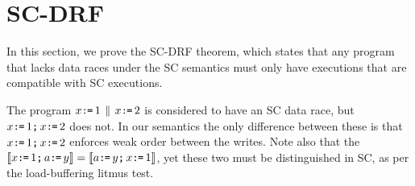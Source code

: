 \section{SC-DRF}


In this section, we prove the SC-DRF theorem, which states that any program
that lacks data races under the SC semantics must only have executions that
are compatible with SC executions.

The program $x\GETS1\PAR x\GETS2$ is considered to have an SC data race, but
$x\GETS1\SEMI x\GETS2$ does not.  In our semantics the only difference
between these is that $x\GETS1\SEMI x\GETS2$ enforces weak order between the
writes.  Note also that the
$\sem{x\GETS1\SEMI a\GETS y}=\sem{a\GETS y\SEMI x\GETS1}$, yet these two must
be distinguished in SC, as per the load-buffering litmus test.

